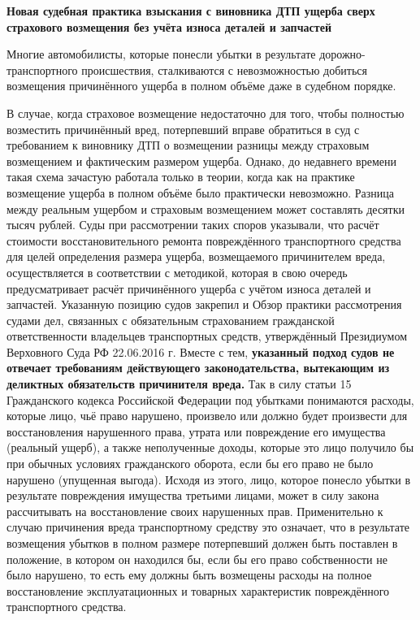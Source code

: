 \begin{center}
	\textbf{{\LARGE Новая судебная практика взыскания с виновника ДТП ущерба сверх страхового возмещения без учёта износа деталей и запчастей}}
	\end{center}
\vspace{5mm}



Многие автомобилисты, которые понесли убытки в результате дорожно-транспортного происшествия, сталкиваются с невозможностью добиться возмещения причинённого ущерба в полном объёме даже в судебном порядке.


В случае, когда страховое возмещение недостаточно для того, чтобы полностью возместить причинённый вред, потерпевший вправе обратиться в суд с требованием к виновнику ДТП о возмещении разницы между страховым возмещением и фактическим размером ущерба. Однако, до недавнего времени такая схема зачастую работала только в теории, когда как на практике возмещение ущерба в полном объёме было практически невозможно. Разница между реальным ущербом и страховым возмещением может составлять десятки тысяч рублей. 
Суды при рассмотрении таких споров указывали, что расчёт стоимости восстановительного ремонта повреждённого транспортного средства для целей определения размера ущерба, возмещаемого причинителем вреда, осуществляется в соответствии с методикой, которая в свою очередь предусматривает расчёт причинённого ущерба с учётом износа деталей и запчастей. Указанную позицию судов закрепил и Обзор практики рассмотрения судами дел, связанных с обязательным страхованием гражданской ответственности владельцев транспортных средств, утверждённый Президиумом Верховного Суда РФ 22.06.2016 г. 
Вместе с тем, \textbf{указанный подход судов не отвечает требованиям действующего законодательства, вытекающим из деликтных обязательств причинителя вреда. }
Так в силу статьи 15 Гражданского кодекса Российской Федерации под убытками понимаются расходы, которые лицо, чьё право нарушено, произвело или должно будет произвести для восстановления нарушенного права, утрата или повреждение его имущества (реальный ущерб), а также неполученные доходы, которые это лицо получило бы при обычных условиях гражданского оборота, если бы его право не было нарушено (упущенная выгода). 
Исходя из этого, лицо, которое понесло убытки в результате повреждения имущества третьими лицами, может в силу закона рассчитывать на восстановление своих нарушенных прав. Применительно к случаю причинения вреда транспортному средству это означает, что в результате возмещения убытков в полном размере потерпевший должен быть поставлен в положение, в котором он находился бы, если бы его право собственности не было нарушено, то есть ему должны быть возмещены расходы на полное восстановление эксплуатационных и товарных характеристик повреждённого транспортного средства.


